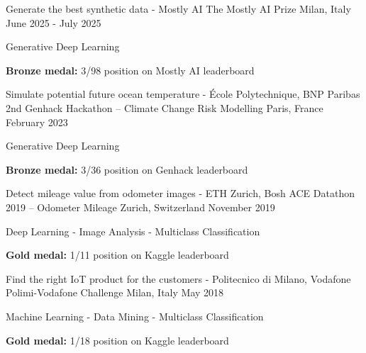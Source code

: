 \begin{cventries}
    \cventry
    {Generate the best synthetic data - Mostly AI} %
    {The Mostly AI Prize} %
    {Milan, Italy} %
    {June 2025 - July 2025} %
    {
      \begin{cvitems} %
         \item{Generative Deep Learning}
         \vspace{0.5mm}
         \item{\textbf{Bronze medal:} 3/98 position on Mostly AI leaderboard}
      \end{cvitems}
    }
    \vspace{2mm}
    \cventry
    {Simulate potential future ocean temperature - École Polytechnique, BNP Paribas} %
    {2nd Genhack Hackathon – Climate Change Risk Modelling} %
    {Paris, France} %
    {February 2023} %
    {
      \begin{cvitems} %
         \item{Generative Deep Learning}
         \vspace{0.5mm}
         \item{\textbf{Bronze medal:} 3/36 position on Genhack leaderboard}
      \end{cvitems}
    }
    \vspace{2mm}
    \cventry
    {Detect mileage value from odometer images - ETH Zurich, Bosh} %
    {ACE Datathon 2019 – Odometer Mileage} %
    {Zurich, Switzerland} %
    {November 2019} %
    {
      \begin{cvitems} %
         \item{Deep Learning - Image Analysis - Multiclass Classification}
         \vspace{0.5mm}
         \item{\textbf{Gold medal:} 1/11 position on Kaggle leaderboard}
      \end{cvitems}
    }
    \vspace{2mm}
    \cventry
    {Find the right IoT product for the customers - Politecnico di Milano, Vodafone} %
    {Polimi-Vodafone Challenge } %
    {Milan, Italy} %
    {May 2018} %
    {
      \begin{cvitems} %
         \item{Machine Learning - Data Mining - Multiclass Classification}
         \vspace{0.5mm}
         \item{\textbf{Gold medal:} 1/18 position on Kaggle leaderboard}
      \end{cvitems}
    }
\end{cventries}